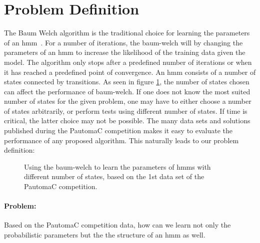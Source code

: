 \section{Problem Definition}

The Baum Welch algorithm is the traditional choice for learning the parameters of an \gls{hmm}~\cite{PautomaCTR}. 
For a number of iterations, the \gls{baum-welch} will by changing the parameters of an \gls{hmm} to increase the likelihood of the training data given the model. The algorithm only stops after a predefined number of iterations or when it has reached a predefined point of convergence.
An \gls{hmm} consists of a number of states connected by transitions. As seen in figure \ref{fig:bw-states-are-important}, the number of states chosen can affect the performance of \gls{baum-welch}. If one does not know the most suited number of states for the given problem, one may have to either choose a number of states arbitrarily, or perform tests using different number of states. If time is critical, the latter choice may not be possible.
The many data sets and solutions published during the PautomaC competition makes it easy to evaluate the performance of any proposed algorithm.
This naturally leads to our problem definition:

\begin{figure}
\begin{centering}
\caption{Using the \gls{baum-welch} to learn the parameters of \gls{hmm}s with different number of states, based on the 1st data set of the PautomaC competition.}
\label{fig:bw-states-are-important} 
\end{centering}
\end{figure}


\paragraph{Problem:}
Based on the PautomaC competition data, how can we learn not only the probabilistic parameters but the the structure of an \gls{hmm} as well.